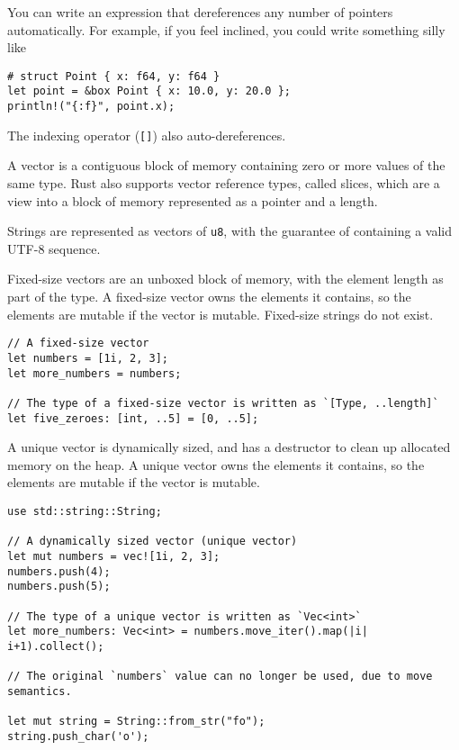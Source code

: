 \documentclass[]{article}
\begin{document}
You can write an expression that dereferences any number of pointers
automatically. For example, if you feel inclined, you could write
something silly like

\begin{verbatim}
# struct Point { x: f64, y: f64 }
let point = &box Point { x: 10.0, y: 20.0 };
println!("{:f}", point.x);
\end{verbatim}

The indexing operator (\texttt{{[}{]}}) also auto-dereferences.


A vector is a contiguous block of memory containing zero or more values
of the same type. Rust also supports vector reference types, called
slices, which are a view into a block of memory represented as a pointer
and a length.

Strings are represented as vectors of \texttt{u8}, with the guarantee of
containing a valid UTF-8 sequence.

Fixed-size vectors are an unboxed block of memory, with the element
length as part of the type. A fixed-size vector owns the elements it
contains, so the elements are mutable if the vector is mutable.
Fixed-size strings do not exist.

\begin{verbatim}
// A fixed-size vector
let numbers = [1i, 2, 3];
let more_numbers = numbers;

// The type of a fixed-size vector is written as `[Type, ..length]`
let five_zeroes: [int, ..5] = [0, ..5];
\end{verbatim}

A unique vector is dynamically sized, and has a destructor to clean up
allocated memory on the heap. A unique vector owns the elements it
contains, so the elements are mutable if the vector is mutable.

\begin{verbatim}
use std::string::String;

// A dynamically sized vector (unique vector)
let mut numbers = vec![1i, 2, 3];
numbers.push(4);
numbers.push(5);

// The type of a unique vector is written as `Vec<int>`
let more_numbers: Vec<int> = numbers.move_iter().map(|i| i+1).collect();

// The original `numbers` value can no longer be used, due to move semantics.

let mut string = String::from_str("fo");
string.push_char('o');
\end{verbatim}
\end{document}
